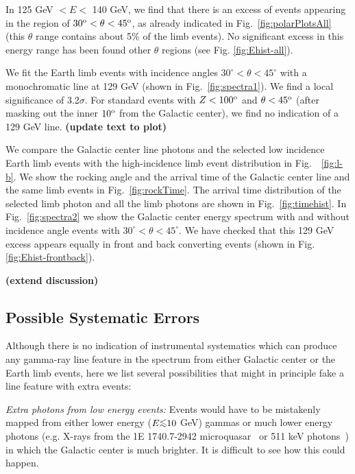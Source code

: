 \documentclass[aps,twocolumn,prd,superscriptaddress,showpacs,nofootinbib,fixfloat]{revtex4}
\newcommand{\degree}{^{\rm o}}
\def\la{\vcenter{\hbox{$<$}\offinterlineskip\hbox{$\sim$}}}
\begin{document}
In 125 GeV $< E <$ 140 GeV, we find that there is an excess
of events appearing in the region of $30\degree < \theta <
45\degree$, as already indicated in
Fig.~\ref{fig:polarPlotsAll} (this $\theta$ range contains
about 5\% of the limb events). No significant excess in this
energy range has been found other $\theta$ regions (see Fig.
\ref{fig:Ehist-all}). 

We fit the Earth limb events with incidence angles
$30^\circ<\theta<45^\circ$ with a monochromatic line at 129
GeV (shown in Fig.~\ref{fig:spectra1}). We find a local
significance of 3.2$\sigma$. For standard events with
$Z<100\degree$ and $\theta<45\degree$ (after masking out the
inner $10\degree$ from the Galactic center), we find no
indication of a 129 GeV line.  \textbf{(update text to
plot)}

We compare the Galactic center line photons and the selected
low incidence Earth limb events with the high-incidence limb
event distribution in Fig.~~\ref{fig:l-b}. We show the
rocking angle and the arrival time of the Galactic center
line and the same limb events in Fig.~\ref{fig:rockTime}.
The arrival time distribution of the selected limb photon
and all the limb photons are shown in
Fig.~\ref{fig:timehist}. In Fig.~\ref{fig:spectra2} we show
the Galactic center energy spectrum with and without
incidence angle events with $30^\circ<\theta<45^\circ$.  We
have checked that this 129 GeV excess appears equally in
front and back converting events (shown in Fig.
\ref{fig:Ehist-frontback}).

\textbf{(extend discussion)}

\subsection{Possible Systematic Errors}

Although there is no indication of instrumental systematics
which can produce any gamma-ray line feature in the spectrum
from either Galactic center or the Earth limb events, here
we list several possibilities that might in principle fake a
line feature with extra events:

{\it Extra photons from low energy events:} Events would
have to be mistakenly mapped from either lower energy ($E
\la 10$ GeV) gammas or much lower energy photons (e.g.
X-rays from the 1E 1740.7-2942 microquasar~\cite{Gallo:2002}
or 511 keV photons~\cite{Prantzos:2011}) in which the
Galactic center is much brighter.  It is difficult to see
how this could happen.
\end{document}
